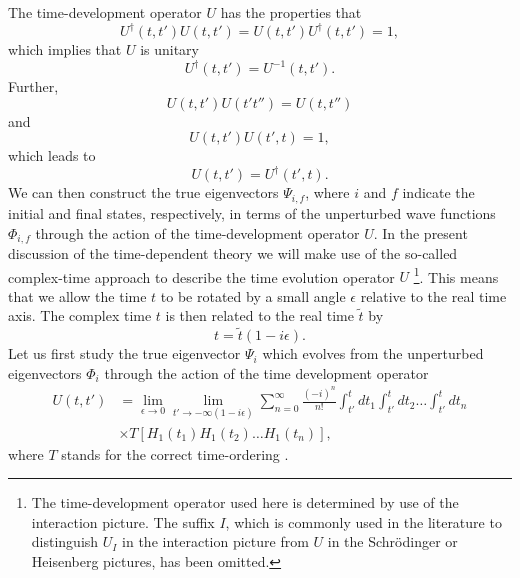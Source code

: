 The time-development operator $U$ has the
properties that 
\begin{equation}
	       U^{\dagger}(t,t')U(t,t')=U(t,t')U^{\dagger}(t,t')=1,
\end{equation}
which implies that $U$ is unitary
\begin{equation}
	       U^{\dagger}(t,t')=U^{-1}(t,t').
\end{equation}
Further,
\begin{equation}
	      U(t,t')U(t't'')=U(t,t'')
\end{equation}
and
\begin{equation}
	      U(t,t')U(t',t)=1,
\end{equation}
which leads to
\begin{equation}
	      U(t,t')=U^{\dagger}(t',t).
\end{equation}
We can then construct the true eigenvectors $\Psi_{i,f}$, where $i$ and
$f$ indicate the initial and final states, respectively, in
terms of the unperturbed wave functions $\Phi_{i,f}$  through the
action of the time-development operator $U$.
In the present discussion of the time-dependent theory we will make
use of the so-called complex-time approach to describe the time
evolution operator $U$ \cite{ko90}
\footnote{The time-development operator used here is determined by use
of the interaction picture. The suffix $I$, which is commonly
used in the literature to distinguish $U_I$ in the interaction
picture from $U$ in the
Schr\"{o}dinger or Heisenberg pictures, has been omitted.}.
This means that we
allow the time $t$ to be rotated by a small angle $\epsilon$
relative to the real time axis. The complex time $t$ is then
related to the real time $\tilde{t}$ by
\begin{equation}
	t=\tilde{t}(1-i\epsilon ).
\end{equation}
Let us first study the true eigenvector $\Psi_{i}$ which evolves
from the unperturbed eigenvectors $\Phi_{i}$ through the action of the
time development operator
\begin{eqnarray}
	       U(t,t')&=\lim_{\epsilon \rightarrow 0}
	      \lim_{t'\rightarrow -\infty (1-i\epsilon )}
	      {\displaystyle\sum_{n=0}^{\infty}\frac{(-i)^n}{n!}
	      \int_{t'}^{t}dt_1  \int_{t'}^{t}dt_2
	      \dots  \int_{t'}^{t}dt_n}
		\\ \nonumber
	     &  \times T\left[H_1(t_1)H_1(t_2)\dots H_1(t_n)\right],
	     \label{eq:timeu}
\end{eqnarray}
where $T$ stands for the correct time-ordering \cite{no88,fw71}.


